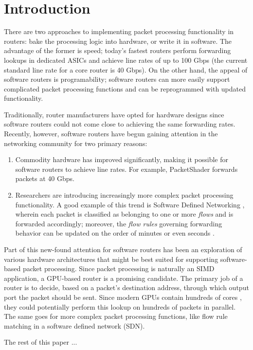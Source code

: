 \section{Introduction}

There are two approaches to implementing packet processing functionality in
routers: bake the processing logic into hardware, or write it in software. The
advantage of the former is speed; today's fastest routers perform forwarding
lookups in dedicated ASICs and achieve line rates of up to 100 Gbps (the
current standard line rate for a core router is 40 Gbps)\cite{Han}. On the
other hand, the appeal of software routers is programability; software routers
can more easily support complicated packet processing functions and can be
reprogrammed with updated functionality.

Traditionally, router manufacturers have opted for hardware designs since
software routers could not come close to achieving the same forwarding rates.
Recently, however, software routers have begun gaining attention in the
networking community for two primary reasons:
\begin{enumerate}
	\item Commodity hardware has improved significantly, making it possible for
	software routers to achieve line rates. For example, PacketShader forwards
	packets at 40 Gbps. 

	\item Researchers are introducing increasingly more complex packet
	processing functionality. A good example of this trend is Software Defined
	Networking , wherein each packet is classified as belonging to
	one or more \emph{flows} and is forwarded accordingly; moreover, the
	\emph{flow rules} governing forwarding behavior can be updated on the order
	of minutes or even seconds .
\end{enumerate}

Part of this new-found attention for software routers has been an exploration
of various hardware architectures that might be best suited for supporting
software-based packet processing. Since packet processing is naturally an SIMD
application, a GPU-based router is a promising candidate. The primary job of a
router is to decide, based on a packet's destination address, through which
output port the packet should be sent. Since modern GPUs contain hundreds of
cores , they could potentially perform this lookup on hundreds of
packets in parallel. The same goes for more complex packet processing
functions, like flow rule matching in a software defined network (SDN).


The rest of this paper ... 
